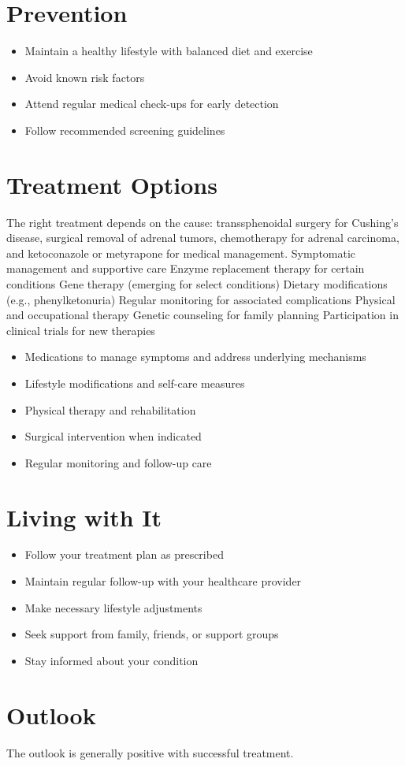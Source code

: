 \section{Prevention}
\begin{itemize}[noitemsep]
  \item Maintain a healthy lifestyle with balanced diet and exercise
  \item Avoid known risk factors
  \item Attend regular medical check-ups for early detection
  \item Follow recommended screening guidelines
\end{itemize}
\section{Treatment Options}
The right treatment depends on the cause: transsphenoidal surgery for Cushing's disease, surgical removal of adrenal tumors, chemotherapy for adrenal carcinoma, and ketoconazole or metyrapone for medical management. Symptomatic management and supportive care Enzyme replacement therapy for certain conditions Gene therapy (emerging for select conditions) Dietary modifications (e.g., phenylketonuria) Regular monitoring for associated complications Physical and occupational therapy Genetic counseling for family planning Participation in clinical trials for new therapies

\begin{itemize}[noitemsep]
  \item Medications to manage symptoms and address underlying mechanisms
  \item Lifestyle modifications and self-care measures
  \item Physical therapy and rehabilitation
  \item Surgical intervention when indicated
  \item Regular monitoring and follow-up care
\end{itemize}
\section{Living with It}
\begin{itemize}[noitemsep]
  \item Follow your treatment plan as prescribed
  \item Maintain regular follow-up with your healthcare provider
  \item Make necessary lifestyle adjustments
  \item Seek support from family, friends, or support groups
  \item Stay informed about your condition
\end{itemize}
\section{Outlook}
The outlook is generally positive with successful treatment.
